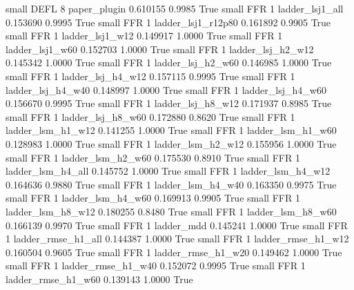      small     DEFL                 8             paper_plugin   0.610155      0.9985    True
     small      FFR                 1          ladder_lsj1_all   0.153690      0.9995    True
     small      FFR                 1       ladder_lsj1_r12p80   0.161892      0.9905    True
     small      FFR                 1          ladder_lsj1_w12   0.149917      1.0000    True
     small      FFR                 1          ladder_lsj1_w60   0.152703      1.0000    True
     small      FFR                 1        ladder_lsj_h2_w12   0.145342      1.0000    True
     small      FFR                 1        ladder_lsj_h2_w60   0.146985      1.0000    True
     small      FFR                 1        ladder_lsj_h4_w12   0.157115      0.9995    True
     small      FFR                 1        ladder_lsj_h4_w40   0.148997      1.0000    True
     small      FFR                 1        ladder_lsj_h4_w60   0.156670      0.9995    True
     small      FFR                 1        ladder_lsj_h8_w12   0.171937      0.8985    True
     small      FFR                 1        ladder_lsj_h8_w60   0.172880      0.8620    True
     small      FFR                 1        ladder_lsm_h1_w12   0.141255      1.0000    True
     small      FFR                 1        ladder_lsm_h1_w60   0.128983      1.0000    True
     small      FFR                 1        ladder_lsm_h2_w12   0.155956      1.0000    True
     small      FFR                 1        ladder_lsm_h2_w60   0.175530      0.8910    True
     small      FFR                 1        ladder_lsm_h4_all   0.145752      1.0000    True
     small      FFR                 1        ladder_lsm_h4_w12   0.164636      0.9880    True
     small      FFR                 1        ladder_lsm_h4_w40   0.163350      0.9975    True
     small      FFR                 1        ladder_lsm_h4_w60   0.169913      0.9905    True
     small      FFR                 1        ladder_lsm_h8_w12   0.180255      0.8480    True
     small      FFR                 1        ladder_lsm_h8_w60   0.166139      0.9970    True
     small      FFR                 1               ladder_mdd   0.145241      1.0000    True
     small      FFR                 1       ladder_rmse_h1_all   0.144387      1.0000    True
     small      FFR                 1       ladder_rmse_h1_w12   0.160504      0.9605    True
     small      FFR                 1       ladder_rmse_h1_w20   0.149462      1.0000    True
     small      FFR                 1       ladder_rmse_h1_w40   0.152072      0.9995    True
     small      FFR                 1       ladder_rmse_h1_w60   0.139143      1.0000    True
